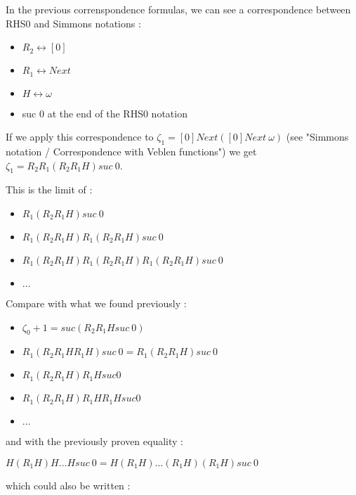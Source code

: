 \documentclass[10pt]{article}
\begin{document}
In the previous correnspondence formulas, we can see a correspondence between RHS0 and Simmons notations :

\begin{itemize}
     \setlength{\itemsep}{1pt}
     \setlength{\parskip}{0pt}
     \setlength{\parsep}{0pt}
\item \( R_2 \leftrightarrow [0] \)
\item \( R_1 \leftrightarrow Next \)
\item \( H \leftrightarrow \omega \)
\item suc 0 at the end of the RHS0 notation
\end{itemize}

If we apply this correspondence to \( \zeta_1 = [0] Next ([0] Next\ \omega) \) (see "Simmons notation / Correspondence with Veblen functions") we get \( \zeta_1 = R_2 R_1 (R_2 R_1 H) suc\ 0 \).

\bigskip

This is the limit of :

\begin{itemize}
     \setlength{\itemsep}{1pt}
     \setlength{\parskip}{0pt}
     \setlength{\parsep}{0pt}
\item \( R_1 (R_2 R_1 H) suc\ 0 \) 
\item \( R_1 (R_2 R_1 H) R_1 (R_2 R_1 H) suc\ 0 \)
\item \( R_1 (R_2 R_1 H) R_1 (R_2 R_1 H) R_1 (R_2 R_1 H) suc\ 0 \)
\item \( \ldots \)
\end{itemize}

Compare with what we found previously :

\begin{itemize}
     \setlength{\itemsep}{1pt}
     \setlength{\parskip}{0pt}
     \setlength{\parsep}{0pt}
\item \( \zeta_0+1 = suc (R_2 R_1 H suc\ 0) \)
\item \( R_1 (R_2 R_1 H R_1 H) suc\ 0 = R_1 (R_2 R_1 H) suc\ 0 \)
\item \( R_1 (R_2 R_1 H) R_1 H suc 0 \)
\item \( R_1 (R_2 R_1 H) R_1 H R_1 H suc 0 \)
\item \( \ldots \)
\end{itemize}

and with the previously proven equality :

\( H (R_1 H) H \ldots H suc\ 0 = H (R_1 H) \ldots (R_1 H) (R_1 H) suc\ 0 \)

which could also be written :
\end{document}
